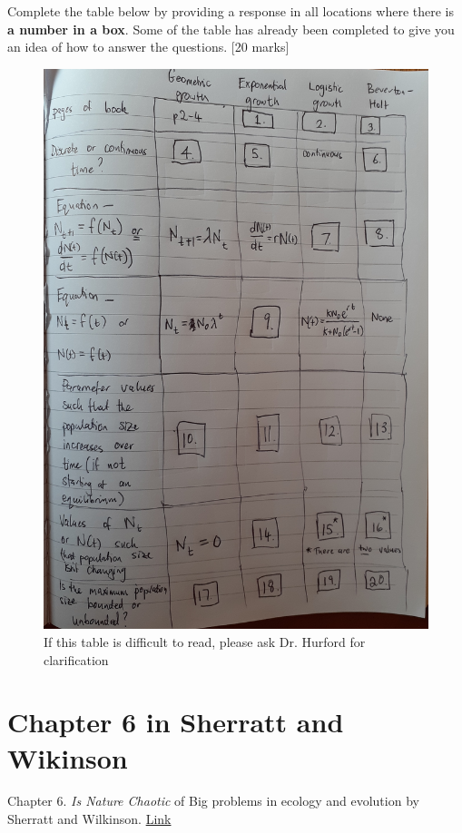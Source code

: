 \documentclass[]{book}
\begin{document}
Complete the table below by providing a response in all locations where
there is \textbf{a number in a box}. Some of the table has already been
completed to give you an idea of how to answer the questions. {[}20
marks{]}

\begin{figure}
\includegraphics[width=1.2\linewidth]{figures/midterm} \caption{If this table is difficult to read, please ask Dr. Hurford for clarification}\label{fig:midterm}
\end{figure}

\section{Chapter 6 in Sherratt and
Wikinson}\label{chapter-6-in-sherratt-and-wikinson}

Chapter 6. \emph{Is Nature Chaotic} of Big problems in ecology and
evolution by Sherratt and Wilkinson.
\href{https://ebookcentral.proquest.com/lib/mun/reader.action?docID=430616\&ppg=136}{Link}
\end{document}
